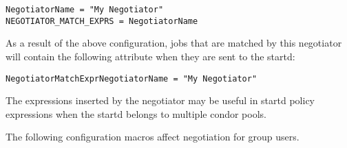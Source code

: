 \begin{description}
\begin{verbatim}
NegotiatorName = "My Negotiator"
NEGOTIATOR_MATCH_EXPRS = NegotiatorName
\end{verbatim}

As a result of the above configuration, jobs that are matched by this
negotiator will contain the following attribute when they are sent to
the startd:

\begin{verbatim}
NegotiatorMatchExprNegotiatorName = "My Negotiator"
\end{verbatim}

The expressions inserted by the negotiator may be useful in startd
policy expressions when the startd belongs to multiple condor pools.

\end{description}
The following configuration macros affect negotiation for group users.
